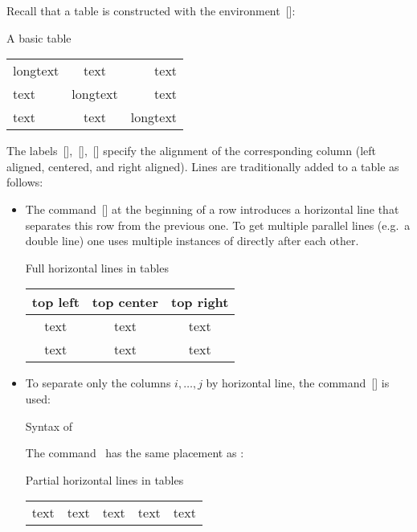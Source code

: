 Recall that a table is constructed with the environment~[\envname]:
\begin{showlatex}{A basic table}
\begin{tabular}{lcr}
  longtext & text     & text      \\
  text     & longtext & text      \\
  text     & text     & longtext
\end{tabular}
\end{showlatex}
The labels~[\optname],~[\optname],~[\optname] specify the alignment of the corresponding column (left aligned, centered, and right aligned).
Lines are traditionally added to a table as follows:
\begin{itemize}
  \item
    The command~[\comname] at the beginning of a row introduces a horizontal line that separates this row from the previous one.
    To get multiple parallel lines (e.g.\ a double line) one uses multiple instances of  directly after each other.
    \begin{showlatex}{Full horizontal lines in tables}
\begin{center}
\begin{tabular}{ccc}
  top left & top center & top right \\
  \hline\hline
  text     & text       & text      \\
  \hline
  text     & text       & text
\end{tabular}
\end{center}
  \end{showlatex}
  \item
    To separate only the columns $i, \dotsc, j$ by horizontal line, the command~[\comname] is used:
    \begin{showcode}{Syntax of }
    \end{showcode}
    The command~ has the same placement as :
    \begin{showlatex}{Partial horizontal lines in tables}
\begin{center}
\begin{tabular}{ccccc}
  text & text & text & text & text \\

\end{tabular}
\end{center}
\end{showlatex}
\end{itemize}
